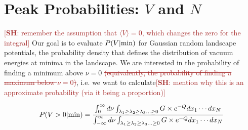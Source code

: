 \documentclass[12pt]{article}
\newcommand{\re}[1]{\textcolor{blue}{[{\bf RE}: #1]}}
\newcommand{\SH}[1]{\textcolor{brown}{[{\bf SH}: #1]}}
\newcommand{\sh}[1]{\textcolor{brown}{#1}}
\begin{document}



\section{Peak Probabilities: $V$ and $N$} \label{PeakNumbers}
\SH{remember the assumption that $\langle V\rangle = 0$, which changes the zero for the integral}
Our goal  is to evaluate $P(V|{\rm min})$ for  Gaussian random landscape potentials, the probability density that defines the distribution of vacuum energies at minima in the landscape. We are interested in the probability of finding a minimum above $\nu = 0$ \sh{\sout{(equivalently, the probability of finding a maximum below $\nu = 0$)}}, i.e. we want to calculate\SH{mention why this is an approximate probability (via it being a proportion)}

\begin{equation} \label{PminIntegral}
P(V>0|{\rm min}) =  \frac{\int^\infty_0 d\nu \int_{\lambda_1 \geq \lambda_2 \geq \lambda_3 \ldots \geq 0} G \times e^{-Q} dx_1  \cdots dx_N}{\int^\infty_{-\infty} d\nu \int_{\lambda_1 \geq \lambda_2 \geq \lambda_3 \ldots \geq 0} G \times e^{-Q} dx_1  \cdots dx_N}
\end{equation}
\end{document}
